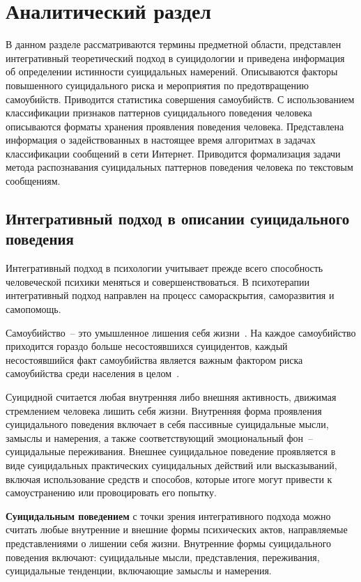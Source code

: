 \section{Аналитический раздел}

В данном разделе рассматриваются термины предметной области, представлен интегративный теоретический подход в суицидологии и приведена информация об определении истинности суицидальных намерений. 
Описываются факторы повышенного суицидального риска и мероприятия по предотвращению самоубийств. 
Приводится статистика совершения самоубийств.
С использованием классификации признаков паттернов суицидального поведения человека описываются форматы хранения проявления поведения человека.
Представлена информация о задействованных в настоящее время алгоритмах в задачах классификации сообщений в сети Интернет.
Приводится формализация задачи метода распознавания суицидальных паттернов поведения человека по текстовым сообщениям.

\subsection{Интегративный подход в описании суицидального поведения}

Интегративный подход в психологии учитывает прежде всего способность человеческой психики меняться и совершенствоваться. В психотерапии интегративный подход направлен на процесс самораскрытия, саморазвития и самопомощь.~\cite{integ}

Самоубийство~-- это умышленное лишения себя жизни~\cite{fuckingSuicideDefinition}. 
На каждое самоубийство приходится гораздо больше несостоявшихся суицидентов, каждый несостоявшийся факт самоубийства является важным фактором риска самоубийства среди населения в целом~\cite{suicideVOZDouble}.

Суицидной считается любая внутренняя либо внешняя активность, движимая стремлением человека лишить себя жизни. Внутренняя форма проявления суицидального поведения включает в себя пассивные суицидальные мысли, замыслы и намерения, а также соответствующий эмоциональный фон~-- суицидальные переживания. Внешнее суицидальное поведение проявляется в виде суицидальных практических суицидальных действий или высказываний, включая использование средств и способов, которые  итоге могут привести к самоустранению или провоцировать его попытку.~\cite{suicidalContent}

\textbf{Суицидальным поведением} с точки зрения интегративного подхода можно считать любые внутренние и внешние формы психических актов, направляемые представлениями о лишении себя жизни. 
Внутренние формы суицидального поведения включают: суицидальные мысли, представления, переживания, суицидальные тенденции, включающие замыслы и намерения.~\cite{starsen} 

